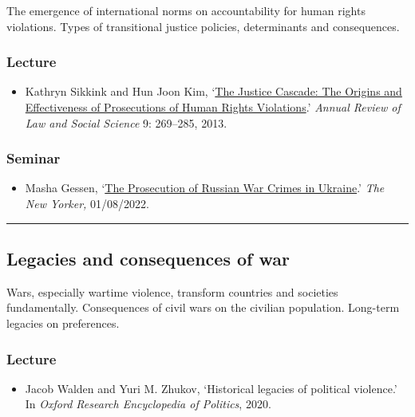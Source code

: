 \documentclass[12pt, a4paper]{article}
\begin{document}
The emergence of international norms on accountability for human rights violations. Types of transitional justice policies, determinants and consequences.

\subsubsection*{Lecture}

\begin{itemize}
\setlength\itemsep{0pt}
\item Kathryn Sikkink and Hun Joon Kim, `\href{https://doi.org/10.1146/annurev-lawsocsci-102612-133956}{The Justice Cascade: The Origins and Effectiveness of Prosecutions of Human Rights Violations}.' \textit{Annual Review of Law and Social Science} 9: 269--285, 2013.
\end{itemize}

\subsubsection*{Seminar}

\begin{itemize}
\setlength\itemsep{0pt}
\item Masha Gessen, `\href{https://www.newyorker.com/magazine/2022/08/08/the-prosecution-of-russian-war-crimes-in-ukraine}{The Prosecution of Russian War Crimes in Ukraine}.' \textit{The New Yorker,} 01/08/2022.
\end{itemize}

\hrule %

\subsection{Legacies and consequences of war}\label{legacies}

Wars, especially wartime violence, transform countries and societies fundamentally. Consequences of civil wars on the civilian population. Long-term legacies on preferences.

\subsubsection*{Lecture}

\begin{itemize}
\setlength\itemsep{0pt}
\item Jacob Walden and Yuri M. Zhukov, `Historical legacies of political violence.' In \textit{Oxford Research Encyclopedia of Politics}, 2020.
\end{itemize}
\end{document}
